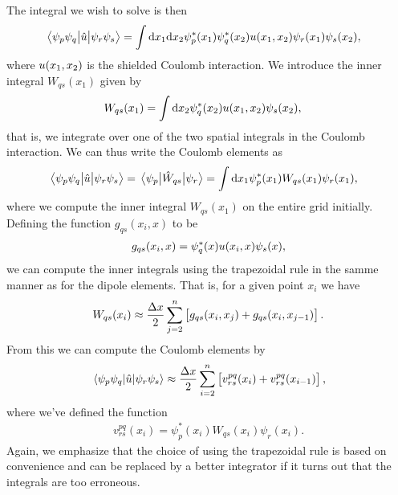         The integral we wish to solve is then
        \begin{align}
            \mel{\psi_{p}\psi_{q}}{\hat{u}}{\psi_{r}\psi_{s}}
            &=
            \int\dd x_1 \dd x_2
            \psi^{*}_{p}(x_1)\psi^{*}_{q}(x_2)
            u(x_1, x_2)
            \psi_{r}(x_1)
            \psi_{s}(x_2),
        \end{align}
        where $u(x_1, x_2)$ is the shielded Coulomb interaction.
        We introduce the inner integral $W_{qs}(x_1)$ given by
        \begin{align}
            W_{qs}(x_1)
            &= \int\dd x_2
            \psi^{*}_{q}(x_2) u(x_1, x_2)
            \psi_{s}(x_2),
        \end{align}
        that is, we integrate over one of the two spatial integrals in the
        Coulomb interaction.
        We can thus write the Coulomb elements as
        \begin{align}
            \mel{\psi_{p}\psi_{q}}{\hat{u}}{\psi_{r}\psi_{s}}
            &=
            \mel{\psi_{p}}{\hat{W}_{qs}}{\psi_{r}}
            =
            \int\dd x_1
            \psi^{*}_{p}(x_1)
            W_{qs}(x_1)
            \psi_{r}(x_1),
        \end{align}
        where we compute the inner integral $W_{qs}(x_1)$ on the entire grid
        initially.
        Defining the function $g_{qs}(x_i, x)$ to be
        \begin{align}
            g_{qs}(x_i, x) = \psi^{*}_{q}(x) u(x_i, x) \psi_s(x),
        \end{align}
        we can compute the inner integrals using the trapezoidal rule in the
        samme manner as for the dipole elements.
        That is, for a given point $x_i$ we have
        \begin{align}
            W_{qs}(x_i)
            \approx \frac{\Delta x}{2}
            \sum_{j = 2}^{n}
            \left[ 
                g_{qs}(x_i, x_j) + g_{qs}(x_i, x_{j - 1})
             \right].
        \end{align}
        From this we can compute the Coulomb elements by
        \begin{align}
            \mel*{\psi_{p}\psi_{q}}{\hat{u}}{\psi_{r}\psi_{s}}
            \approx
            \frac{\Delta x}{2}
            \sum_{i = 2}^{n}
            \left[ 
                v^{pq}_{rs}(x_i) + v^{pq}_{rs}(x_{i - 1})
             \right],
        \end{align}
        where we've defined the function
        \begin{align}
            v^{pq}_{rs}(x_i)
            = \psi^{*}_{p}(x_i) W_{qs}(x_i) \psi_{r}(x_i).
        \end{align}
        Again, we emphasize that the choice of using the trapezoidal rule is
        based on convenience and can be replaced by a better integrator if it
        turns out that the integrals are too erroneous.


